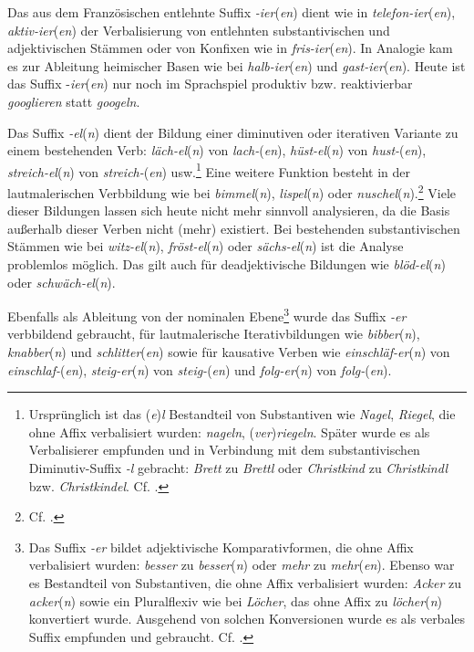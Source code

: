 Das aus dem Französischen entlehnte Suffix \textit{-ier}(\textit{en}) dient wie in \textit{telefon-ier}(\textit{en}), \textit{aktiv-ier}(\textit{en}) der Verbalisierung von entlehnten substantivischen und adjektivischen Stämmen oder von Konfixen wie in \textit{fris-ier}(\textit{en}). In Analogie kam es zur Ableitung heimischer Basen wie bei \textit{halb-ier}(\textit{en}) und \textit{gast-ier}(\textit{en}). Heute ist das Suffix -\textit{ier}(\textit{en}) nur noch im Sprachspiel produktiv bzw. reaktivierbar \textit{googlieren} statt \textit{googeln}.

Das Suffix \textit{-el}(\textit{n}) dient der Bildung einer diminutiven oder iterativen Variante zu einem bestehenden Verb: \textit{läch-el}(\textit{n}) von \textit{lach-}(\textit{en}), \textit{hüst-el}(\textit{n}) von \textit{hust-}(\textit{en}), \textit{streich-el}(\textit{n}) von \textit{streich-}(\textit{en}) usw.\footnote{Ursprünglich ist das (\textit{e})\textit{l} Bestandteil von Substantiven wie \textit{Nagel}, \textit{Riegel}, die ohne Affix verbalisiert wurden: \textit{nageln}, (\textit{ver})\textit{riegeln}. Später wurde es als Verbalisierer empfunden und in Verbindung mit dem substantivischen Diminutiv-Suffix \textit{-l} gebracht: \textit{Brett} zu \textit{Brettl} oder \textit{Christkind} zu \textit{Christkindl} bzw. \textit{Christkindel}. Cf. \citet[96--98]{Wilmanns1896Wb}.} Eine weitere Funktion besteht in der lautmalerischen Verbbildung wie bei \textit{bimmel}(\textit{n}), \textit{lispel}(\textit{n}) oder \textit{nuschel}(\textit{n}).\footnote{Cf. \citet[431]{FleischerBarz2012}.} Viele dieser Bildungen lassen sich heute nicht mehr sinnvoll analysieren, da die Basis außerhalb dieser Verben nicht (mehr) existiert. Bei bestehenden substantivischen Stämmen wie bei \textit{witz-el}(\textit{n}), \textit{fröst-el}(\textit{n}) oder \textit{sächs-el}(\textit{n}) ist die Analyse problemlos möglich. Das gilt auch für deadjektivische Bildungen wie \textit{blöd-el}(\textit{n}) oder \textit{schwäch-el}(\textit{n}).

Ebenfalls als Ableitung von der nominalen Ebene\footnote{Das Suffix \textit{-er} bildet adjektivische Komparativformen, die ohne Affix verbalisiert wurden: \textit{besser} zu \textit{besser}(\textit{n}) oder \textit{mehr} zu \textit{mehr}(\textit{en}). Ebenso war es Bestandteil von Substantiven, die ohne Affix verbalisiert wurden: \textit{Acker} zu \textit{acker}(\textit{n}) sowie ein Pluralflexiv wie bei \textit{Löcher}, das ohne Affix zu \textit{löcher}(\textit{n}) konvertiert wurde. Ausgehend von solchen Konversionen wurde es als verbales Suffix empfunden und gebraucht. Cf. \citet[92--93]{Williams1981}.} wurde das Suffix \textit{-er} verbbildend gebraucht, \zB für lautmalerische Iterativbildungen wie \textit{bibber}(\textit{n}), \textit{knabber}(\textit{n}) und \textit{schlitter}(\textit{en}) sowie für kausative Verben wie \textit{einschläf-er}(\textit{n}) von \textit{einschlaf-}(\textit{en}), \textit{steig-er}(\textit{n}) von \textit{steig-}(\textit{en}) und \textit{folg-er}(\textit{n}) von \textit{folg-}(\textit{en}).

